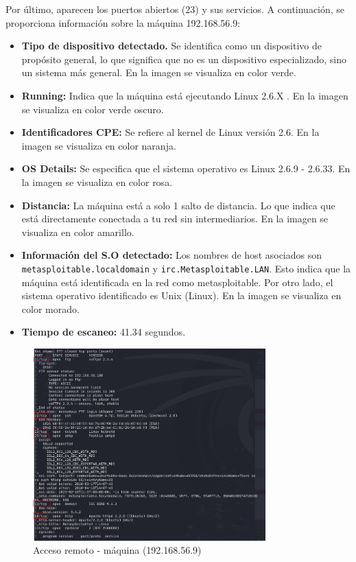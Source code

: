 \documentclass[a4paper,12pt]{article} %
\begin{document}
        Por último, aparecen los puertos abiertos (23) y sus servicios. A continuación, se proporciona información sobre la máquina 192.168.56.9:
    \begin{itemize}
        \item \textbf{Tipo de dispositivo detectado.} Se identifica como un dispositivo de propósito general, lo que significa que no es un dispositivo especializado, sino un sistema más general. En la imagen se visualiza en color verde.
        \item \textbf{Running: } Indica que la máquina está ejecutando Linux 2.6.X . En la imagen se visualiza en color verde oscuro.
        \item \textbf{Identificadores CPE: } Se refiere al kernel de Linux versión 2.6. En la imagen se visualiza en color naranja.
        \item \textbf{OS Details: }Se especifica que el sistema operativo es Linux 2.6.9 - 2.6.33. En la imagen se visualiza en color rosa.
        \item \textbf{Distancia: } La máquina está a solo 1 salto de distancia. Lo que indica que está directamente conectada a tu red sin intermediarios. En la imagen se visualiza en color amarillo.
        \item \textbf{Información del S.O detectado: } Los nombres de host asociados son \\ \texttt{metasploitable.localdomain} y \texttt{irc.Metasploitable.LAN}. Esto indica que la máquina está identificada en la red como metasploitable. Por otro lado, el sistema operativo identificado es Unix (Linux). En la imagen se visualiza en color morado.
        \item \textbf{Tiempo de escaneo:} 41.34 segundos.
    \end{itemize}
        
        \begin{figure} [hp!]
         \centering
         \includegraphics[width=0.8\textwidth]{Imagenes/puertos9.png}
         \caption{Acceso remoto - máquina (192.168.56.9) }
         \label{fig:wireshark2}
        \end{figure}
        
\end{document}
